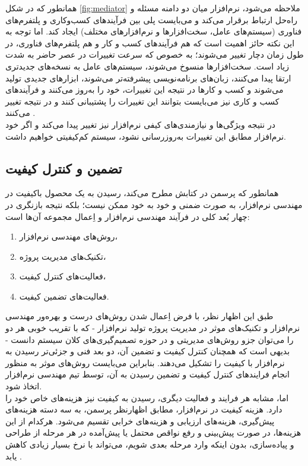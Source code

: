 همانطور که در شکل
\ref{fig:mediator}
ملاحظه می‌شود، نرم‌افزار میان دو دامنه مسئله و راه‌حل ارتباط برقرار می‌کند و می‌بایست پلی بین فرآیند‌های کسب‌و‌کاری و پلتفرم‌های فناوری (سیستم‌های عامل، سخت‌افزارها و نرم‌افزارهای مختلف) ایجاد کند. اما توجه به این نکته حائز اهمیت است که هم فرآیندهای کسب ‌و کار و هم پلتفرم‌های فناوری، در طول زمان دچار تغییر می‌شوند؛ به خصوص که سرعت تغییرات در عصر حاضر به شدت زیاد است. سخت‌افزارها منسوخ می‌شوند، سیستم‌های عامل به نسخه‌های جدیدتری ارتقا پیدا می‌کنند، زبان‌های برنامه‌نویسی پیشرفته‌تر می‌شوند، ابزارهای جدیدی تولید می‌شوند و کسب‌ و کارها در نتیجه این تغییرات، خود را به‌روز می‌کنند و فرآیندهای کسب ‌و کاری نیز می‌بایست بتوانند این تغییرات را پشتیبانی کنند و در نتیجه تغییر می‌کنند
\cite{wagner_software_2013}.\\
در نتیجه ویژگی‌ها و نیازمندی‌های کیفی نرم‌افزار نیز تغییر پیدا می‌کند و اگر خود نرم‌افزار مطابق این تغییرات به‌روز‌رسانی نشود، سیستم کم‌کیفیتی خواهیم داشت.
\subsection{تضمین و کنترل کیفیت}
همانطور که پرسمن در کتابش
\cite{pressman_software_2015}
مطرح می‌کند، رسیدن به یک محصول با‌کیفیت در مهندسی نرم‌افزار، به صورت ضمنی و خود به خود ممکن نیست؛ بلکه نتیجه بازنگری در چهار بُعد کلی در فرآیند مهندسی نرم‌افزار و اِعمال مجموعه آن‌ها است:
\begin{enumerate}
	\item 
	روش‌های مهندسی نرم‌افزار،
	\item 
	تکنیک‌های مدیریت پروژه،
	\item 
	فعالیت‌های کنترل کیفیت،
	\item
	فعالیت‌های تضمین کیفیت.
\end{enumerate}
طبق این اظهار نظر، با فرض اِعمال شدن روش‌های درست و بهره‌ور مهندسی نرم‌افزار و تکنیک‌های موثر در مدیریت پروژه تولید نرم‌افزار - که با تقریب خوبی هر دو را می‌توان جزو روش‌های مدیریتی و در حوزه تصمیم‌گیری‌های کلان سیستم دانست - بدیهی است که همچنان کنترل کیفیت و تضمین آن، دو بعد فنی و جزئی‌تر رسیدن به نرم‌افزار با کیفیت را تشکیل می‌دهند. بنابراین می‌بایست روش‌های موثر به منظور انجام فرایند‌های کنترل کیفیت و تضمین رسیدن به آن، توسط تیم مهندسی نرم‌افزار اتخاذ شود.\\
اما، مشابه هر فرایند و فعالیت دیگری، رسیدن به کیفیت نیز هزینه‌های خاص خود را دارد. هزینه کیفیت در نرم‌افزار، مطابق اظهارنظر پرسمن، به سه دسته هزینه‌های پیش‌گیری، هزینه‌های ارزیابی و هزینه‌های خرابی تقسیم می‌شود. هرکدام از این هزینه‌ها، در صورت پیش‌بینی و رفع نواقص محتمل یا پیش‌آمده در هر مرحله از طراحی و پیاده‌سازی، بدون اینکه وارد مرحله بعدی شویم، می‌تواند با نرخ بسیار زیادی کاهش یابد 
\cite{pressman_software_2015}.
